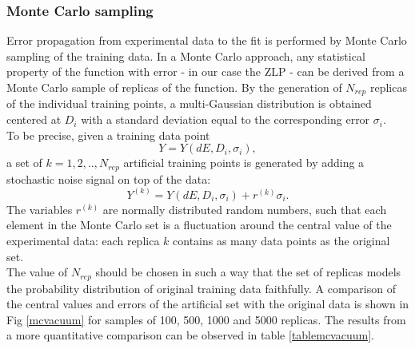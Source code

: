 \subsubsection*{Monte Carlo sampling}
Error propagation from experimental data to the fit is performed by Monte Carlo sampling of the training data. In a Monte Carlo approach, any statistical property of the function with error - in our case the ZLP - can be derived from a Monte Carlo sample of replicas of the function. By the generation of $N_{rep}$ replicas of the individual training points, a multi-Gaussian distribution is obtained centered at $D_i$ with a standard deviation equal to the corresponding error $\sigma_i$. \\
To be precise, given a training data point
\begin{equation}
    Y = Y(dE, D_i,\sigma_i), 
\end{equation} a set of $k= 1,2,..,N_{rep}$ artificial training points is generated by adding a stochastic noise signal on top of the data: 
\begin{equation}
    Y^{(k)} = Y(dE, D_i,\sigma_i) + r^{(k)}\sigma_i.
\end{equation}
The variables $r^{(k)}$ are normally distributed random numbers, such that each element in the Monte Carlo set is a fluctuation around the central value of the experimental data: each replica $k$ contains as many data points as the original set. \\

The value of $N_{rep}$ should be chosen in such a way that the set of replicas models the probability distribution of original training data faithfully. A comparison of the central values and errors of the artificial set with the original data is shown in Fig \ref{mcvacuum} for samples of 100, 500, 1000 and 5000 replicas. The results from a more quantitative comparison can be observed in table \ref{tablemcvacuum}.

